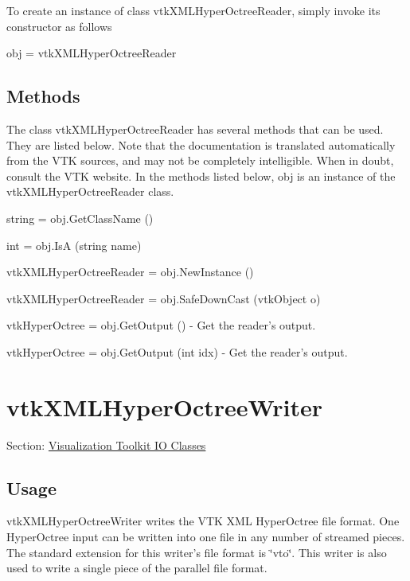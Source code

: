 To create an instance of class vtk\-X\-M\-L\-Hyper\-Octree\-Reader, simply invoke its constructor as follows \begin{DoxyVerb}  obj = vtkXMLHyperOctreeReader
\end{DoxyVerb}
 \hypertarget{vtkwidgets_vtkxyplotwidget_Methods}{}\subsection{Methods}\label{vtkwidgets_vtkxyplotwidget_Methods}
The class vtk\-X\-M\-L\-Hyper\-Octree\-Reader has several methods that can be used. They are listed below. Note that the documentation is translated automatically from the V\-T\-K sources, and may not be completely intelligible. When in doubt, consult the V\-T\-K website. In the methods listed below, {\ttfamily obj} is an instance of the vtk\-X\-M\-L\-Hyper\-Octree\-Reader class. 
\begin{DoxyItemize}
\item {\ttfamily string = obj.\-Get\-Class\-Name ()}  
\item {\ttfamily int = obj.\-Is\-A (string name)}  
\item {\ttfamily vtk\-X\-M\-L\-Hyper\-Octree\-Reader = obj.\-New\-Instance ()}  
\item {\ttfamily vtk\-X\-M\-L\-Hyper\-Octree\-Reader = obj.\-Safe\-Down\-Cast (vtk\-Object o)}  
\item {\ttfamily vtk\-Hyper\-Octree = obj.\-Get\-Output ()} -\/ Get the reader's output.  
\item {\ttfamily vtk\-Hyper\-Octree = obj.\-Get\-Output (int idx)} -\/ Get the reader's output.  
\end{DoxyItemize}\hypertarget{vtkio_vtkxmlhyperoctreewriter}{}\section{vtk\-X\-M\-L\-Hyper\-Octree\-Writer}\label{vtkio_vtkxmlhyperoctreewriter}
Section\-: \hyperlink{sec_vtkio}{Visualization Toolkit I\-O Classes} \hypertarget{vtkwidgets_vtkxyplotwidget_Usage}{}\subsection{Usage}\label{vtkwidgets_vtkxyplotwidget_Usage}
vtk\-X\-M\-L\-Hyper\-Octree\-Writer writes the V\-T\-K X\-M\-L Hyper\-Octree file format. One Hyper\-Octree input can be written into one file in any number of streamed pieces. The standard extension for this writer's file format is \char`\"{}vto\char`\"{}. This writer is also used to write a single piece of the parallel file format.

